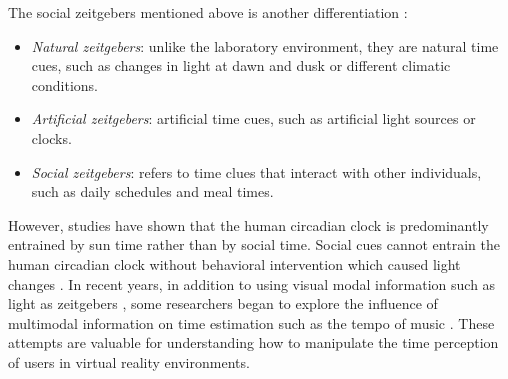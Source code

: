 \documentclass[sigconf]{acmart}
\begin{document}


The social zeitgebers mentioned above is another differentiation \cite{fleissner20138}:

\begin{itemize}
\item \emph{Natural zeitgebers}: unlike the laboratory environment, they are natural time cues, such as changes in light at dawn and dusk or different climatic conditions.
\item \emph{Artificial zeitgebers}: artificial time cues, such as artificial light sources or clocks.
\item \emph{Social zeitgebers}: refers to time clues that interact with other individuals, such as daily schedules and meal times.
\end{itemize}


However, studies have shown that the human circadian clock is predominantly entrained by sun time rather than by social time. Social cues cannot entrain the human circadian clock without behavioral intervention which caused light changes \cite{roenneberg2007human}. In recent years, in addition to using visual modal information such as light as zeitgebers \cite{roenneberg2007human, duffy2005entrainment}, some researchers began to explore the influence of multimodal information on time estimation such as the tempo of music \cite{pizarro2016s}. These attempts are valuable for understanding how to manipulate the time perception of users in virtual reality environments.


\end{document}

